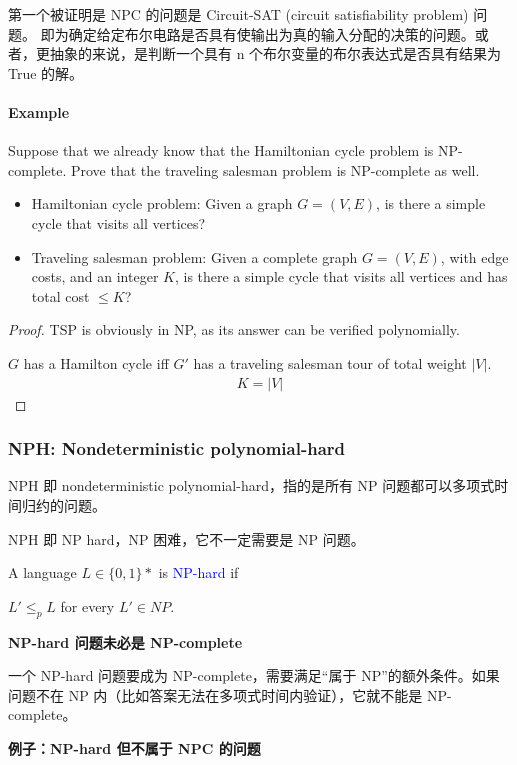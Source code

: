 \documentclass{article}
\begin{document}
第一个被证明是 NPC 的问题是 Circuit-SAT (circuit satisfiability problem) 问题。
即为确定给定布尔电路是否具有使输出为真的输入分配的决策的问题。或者，更抽象的来说，是判断一个具有 n 个布尔变量的布尔表达式是否具有结果为 True 的解。\par

\paragraph{Example}
Suppose that we already know that the Hamiltonian cycle problem is NP-complete.  Prove that the traveling salesman problem is NP-complete as well.

\begin{itemize}
    \item Hamiltonian cycle problem: Given a graph $G=(V, E)$, is there a simple cycle that visits all vertices?
    \item Traveling salesman problem: Given a complete graph $G=(V, E)$, with edge costs, and an integer $K$, is there a simple cycle that visits all vertices and has total cost $\le K$?
\end{itemize}

\begin{proof}
    TSP is obviously in NP, as its answer can be verified polynomially. 
    
    $G$ has a Hamilton cycle iff $G'$ has a traveling salesman tour of total weight $|V|$.
    \begin{align*}
        K=|V|
    \end{align*}
\end{proof}

\subsubsection{NPH: Nondeterministic polynomial-hard}
NPH 即 nondeterministic polynomial-hard，指的是所有 NP 问题都可以多项式时间归约的问题。\par
NPH 即 NP hard，NP 困难，它不一定需要是 NP 问题。

A language $L \in \{0, 1\}*$ is \textcolor{blue}{NP-hard} if\par
$L' \le_p L$ for every $L' \in NP$.

\textbf{NP-hard 问题未必是 NP-complete}

一个 NP-hard 问题要成为 NP-complete，需要满足“属于 NP”的额外条件。如果问题不在 NP 内（比如答案无法在多项式时间内验证），它就不能是 NP-complete。

\textbf{例子：NP-hard 但不属于 NPC 的问题}
\end{document}
